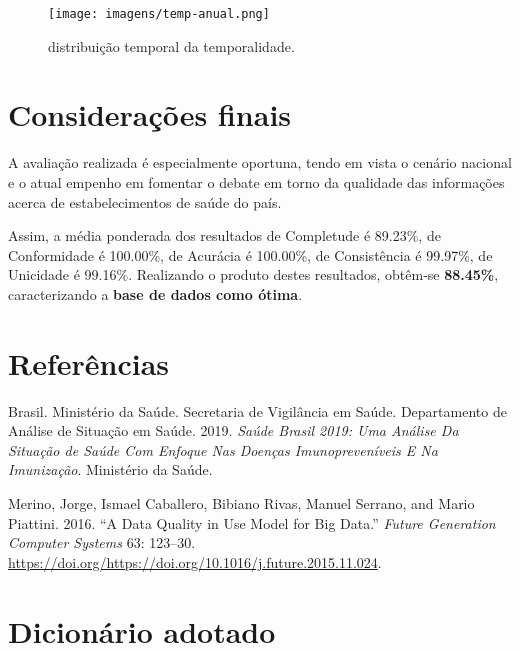 \documentclass[
  12,
  table]{proadi}
\begin{document}
\begin{figure}
\centering
\texttt{[image: imagens/temp-anual.png]}
\caption{distribuição temporal da temporalidade.}
\end{figure}

\hypertarget{considerauxe7uxf5es-finais}{%
\section{Considerações finais}\label{considerauxe7uxf5es-finais}}

A avaliação realizada é especialmente oportuna, tendo em vista o cenário
nacional e o atual empenho em fomentar o debate em torno da qualidade
das informações acerca de estabelecimentos de saúde do país.

Assim, a média ponderada dos resultados de Completude é 89.23\%, de
Conformidade é 100.00\%, de Acurácia é 100.00\%, de Consistência é
99.97\%, de Unicidade é 99.16\%. Realizando o produto destes resultados,
obtêm-se \textbf{88.45\%}, caracterizando a \textbf{base de dados como
ótima}.

\newpage

\hypertarget{referuxeancias}{%
\section{Referências}\label{referuxeancias}}

\hypertarget{refs}{}
\leavevmode\hypertarget{ref-brasil2019}{}%
Brasil. Ministério da Saúde. Secretaria de Vigilância em Saúde.
Departamento de Análise de Situação em Saúde. 2019. \emph{Saúde Brasil
2019: Uma Análise Da Situação de Saúde Com Enfoque Nas Doenças
Imunopreveníveis E Na Imunização}. Ministério da Saúde.

\leavevmode\hypertarget{ref-merino}{}%
Merino, Jorge, Ismael Caballero, Bibiano Rivas, Manuel Serrano, and
Mario Piattini. 2016. ``A Data Quality in Use Model for Big Data.''
\emph{Future Generation Computer Systems} 63: 123--30.
\url{https://doi.org/https://doi.org/10.1016/j.future.2015.11.024}.

\captionsetup[table]{labelformat=empty}

\newpage

\hypertarget{dicionuxe1rio-adotado}{%
\section*{Dicionário adotado}\label{dicionuxe1rio-adotado}}
\end{document}
